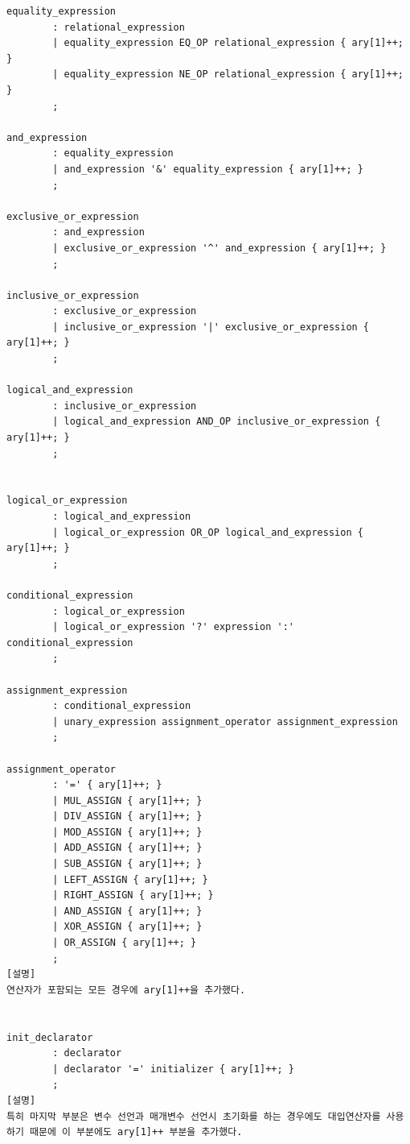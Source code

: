 \documentclass{article}
\begin{document}
\begin{verbatim}
equality_expression
        : relational_expression
        | equality_expression EQ_OP relational_expression { ary[1]++; }
        | equality_expression NE_OP relational_expression { ary[1]++; }
        ;

and_expression
        : equality_expression
        | and_expression '&' equality_expression { ary[1]++; }
        ;

exclusive_or_expression
        : and_expression
        | exclusive_or_expression '^' and_expression { ary[1]++; }
        ;

inclusive_or_expression
        : exclusive_or_expression
        | inclusive_or_expression '|' exclusive_or_expression { ary[1]++; }
        ;

logical_and_expression
        : inclusive_or_expression
        | logical_and_expression AND_OP inclusive_or_expression { ary[1]++; }
        ;


logical_or_expression
        : logical_and_expression
        | logical_or_expression OR_OP logical_and_expression { ary[1]++; }
        ;

conditional_expression
        : logical_or_expression
        | logical_or_expression '?' expression ':' conditional_expression
        ;

assignment_expression
        : conditional_expression
        | unary_expression assignment_operator assignment_expression
        ;

assignment_operator
        : '=' { ary[1]++; }
        | MUL_ASSIGN { ary[1]++; }
        | DIV_ASSIGN { ary[1]++; }
        | MOD_ASSIGN { ary[1]++; }
        | ADD_ASSIGN { ary[1]++; }
        | SUB_ASSIGN { ary[1]++; }
        | LEFT_ASSIGN { ary[1]++; }
        | RIGHT_ASSIGN { ary[1]++; }
        | AND_ASSIGN { ary[1]++; }
        | XOR_ASSIGN { ary[1]++; }
        | OR_ASSIGN { ary[1]++; }
        ;
[설명]
연산자가 포함되는 모든 경우에 ary[1]++을 추가했다.


init_declarator
        : declarator
        | declarator '=' initializer { ary[1]++; }
        ;
[설명]
특히 마지막 부분은 변수 선언과 매개변수 선언시 초기화를 하는 경우에도 대입연산자를 사용하기 때문에 이 부분에도 ary[1]++ 부분을 추가했다. 

\end{verbatim}

\newpage
\end{document}
